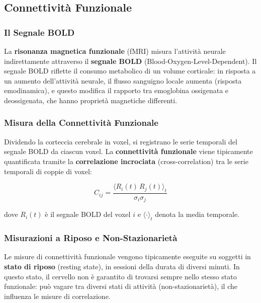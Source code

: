 \subsection{Connettività Funzionale}

\subsubsection{Il Segnale BOLD}

La \textbf{risonanza magnetica funzionale} (fMRI) misura l'attività neurale indirettamente attraverso il \textbf{segnale BOLD} (Blood-Oxygen-Level-Dependent). Il segnale BOLD riflette il consumo metabolico di un volume corticale: in risposta a un aumento dell'attività neurale, il flusso sanguigno locale aumenta (risposta emodinamica), e questo modifica il rapporto tra emoglobina ossigenata e deossigenata, che hanno proprietà magnetiche differenti.



\subsubsection{Misura della Connettività Funzionale}

Dividendo la corteccia cerebrale in voxel, si registrano le serie temporali del segnale BOLD da ciascun voxel. La \textbf{connettività funzionale} viene tipicamente quantificata tramite la \textbf{correlazione incrociata} (cross-correlation)  tra le serie temporali di coppie di voxel:

\begin{equation}
C_{ij} = \frac{\langle R_i(t)\, R_j(t) \rangle_t}{\sigma_i \sigma_j}
\end{equation}

dove $R_i(t)$ è il segnale BOLD del voxel $i$ e $\langle \cdot \rangle_t$ denota la media temporale.

\subsubsection{Misurazioni a Riposo e Non-Stazionarietà}

Le misure di connettività funzionale vengono tipicamente eseguite su soggetti in \textbf{stato di riposo} (resting state), in sessioni della durata di diversi minuti. In questo stato, il cervello non è garantito di trovarsi sempre nello stesso stato funzionale: può vagare tra diversi stati di attività (non-stazionarietà), il che influenza le misure di correlazione.

